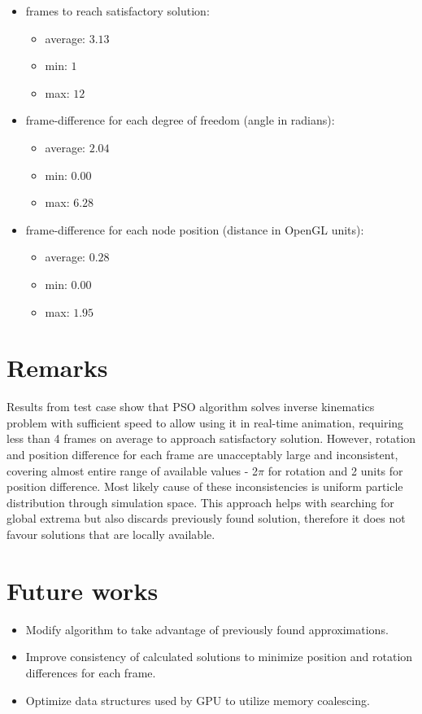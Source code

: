 \documentclass[]{report}
\begin{document}
\begin{itemize}
	\item frames to reach satisfactory solution: 
	\begin{itemize}
		\item average: $3.13$ 
		\item min: $1$
		\item max: $12$
	\end{itemize}
	\item frame-difference for each degree of freedom (angle in radians): 
	\begin{itemize}
		\item average: $2.04$
		\item min: $0.00$
		\item max: $6.28$
	\end{itemize}
	\item frame-difference for each node position (distance in OpenGL units):
	\begin{itemize}
		\item  average: $0.28$ 
		\item min: $0.00$ 
		\item max: $1.95$
	\end{itemize}
\end{itemize}


\chapter*{Remarks}
\noindent Results from test case show that PSO algorithm solves inverse kinematics problem with sufficient speed to allow using it in real-time animation, requiring less than 4 frames on average to approach satisfactory solution. However, rotation and position difference for each frame are unacceptably large and inconsistent, covering almost entire range of available values - 2$\pi$ for rotation and 2 units for position difference. Most likely cause of these inconsistencies is uniform particle distribution through simulation space. This approach helps with searching for global extrema but also discards previously found solution, therefore it does not favour solutions that are locally available.

\chapter*{Future works}
\begin{itemize}
\item Modify algorithm to take advantage of previously found approximations.
\item Improve consistency of calculated solutions to minimize position and rotation differences for each frame.
\item Optimize data structures used by GPU to utilize memory coalescing.
\end{itemize}
\end{document}
